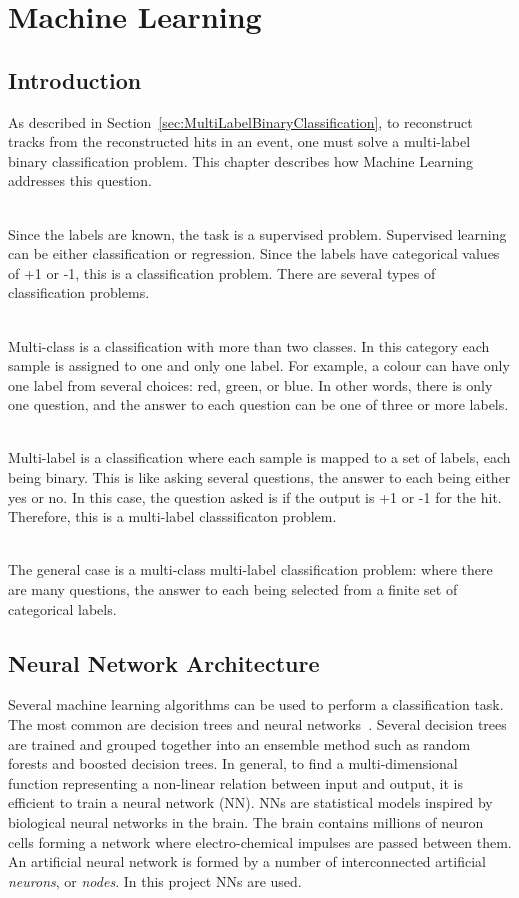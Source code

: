 \chapter{Machine Learning}
\label{chapter:MachineLearning}

\section{Introduction}

As described in Section~\ref{sec:MultiLabelBinaryClassification}, to reconstruct tracks from the reconstructed hits in an event, one must solve a multi-label binary classification problem. This chapter describes how Machine Learning addresses this question.

\ \\Since the labels are known, the task is a supervised problem. Supervised learning can be either classification or regression. Since the labels have categorical values of +1 or -1, this is a classification problem. There are several types of classification problems.

\ \\Multi-class is a classification with more than two classes. In this category each sample is assigned to one and only one label. For example, a colour can have only one label from several choices: red, green, or blue. In other words, there is only one question, and the answer to each question can be one of three or more labels.

\ \\Multi-label is a classification where each sample is mapped to a set of labels, each being binary. This is like asking several questions, the answer to each being either yes or no. In this case, the question asked is if the output is +1 or -1 for the hit. Therefore, this is a multi-label classsificaton problem.

\ \\The general case is a multi-class multi-label classification problem: where there are many questions, the answer to each being selected from a finite set of categorical labels. 

\section{Neural Network Architecture}

Several machine learning algorithms can be used to perform a classification task. The most common are decision trees and neural networks~\cite{AndrewNg}. Several decision trees are trained and grouped together into an ensemble method such as random forests and boosted decision trees. In general, to find a multi-dimensional function representing a non-linear relation between input and output, it is efficient to train a neural network (NN). NNs are statistical models inspired by biological neural networks in the brain. The brain contains millions of neuron cells forming a network where electro-chemical impulses are passed between them. An artificial neural network is formed by a number of interconnected artificial \emph{neurons}, or \emph{nodes}. In this project NNs are used.


